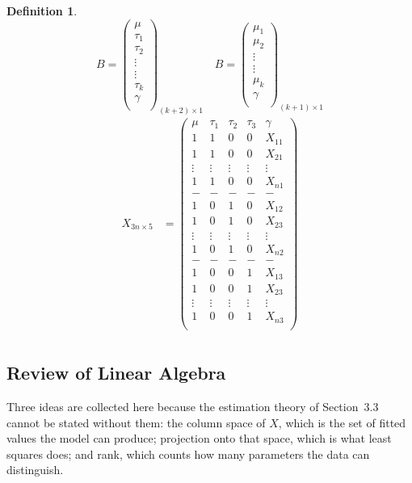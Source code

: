 \documentclass[11pt,a4paper]{article}
\theoremstyle{definition}
\newtheorem{defn}[thm]{Definition}
\begin{document}
\begin{defn}
$$B=
\begin{pmatrix}
\mu\\ \tau_1 \\ \tau_2\\ \vdots\\ \vdots\\ \tau_k \\ \gamma\\
\end{pmatrix}_{(k+2)\times 1}
\quad  B=
\begin{pmatrix}
\mu_1 \\ \mu_2\\ \vdots\\ \vdots \\ \mu_k\\ \gamma\\
\end{pmatrix}_{(k+1)\times 1}
$$
\begin{align*}
X_{3n\times 5} & =
\begin{pmatrix}
\mu & \tau_1 & \tau_2 & \tau_3 & \gamma\\
1 & 1 & 0 & 0 & X_{11}\\
1 & 1 & 0 & 0 & X_{21}\\
\vdots & \vdots & \vdots & \vdots &\vdots\\
1 & 1 & 0 & 0 & X_{n1}\\
- & - & - & - & -\\
1 & 0 & 1 & 0 & X_{12}\\
1 & 0 & 1 & 0 & X_{23}\\
\vdots & \vdots & \vdots & \vdots & \vdots\\
1 & 0 & 1 & 0 & X_{n2}\\
- & - & - & - & -\\
1 & 0 & 0 & 1 & X_{13}\\
1 & 0 & 0 & 1 & X_{23}\\
\vdots & \vdots & \vdots & \vdots & \vdots\\
1 & 0 & 0 & 1 & X_{n3}\\
\end{pmatrix}\\
\end{align*}
\end{defn}


\subsection{Review of Linear Algebra}
Three ideas are collected here because the estimation theory of Section~3.3
cannot be stated without them: the column space of $X$, which is the set of
fitted values the model can produce; projection onto that space, which is what
least squares does; and rank, which counts how many parameters the data can
distinguish.
\end{document}
